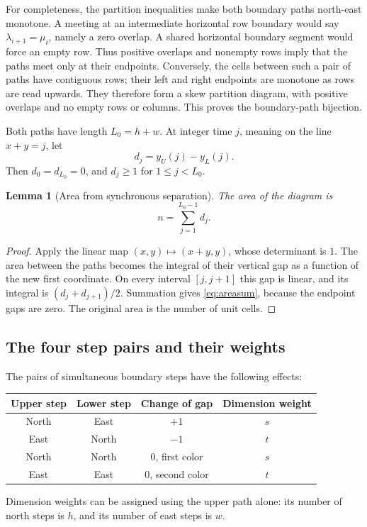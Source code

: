 \documentclass[11pt,letterpaper]{article}
\numberwithin{equation}{section}
\newtheorem{lemma}[theorem]{Lemma}
\theoremstyle{definition}
\begin{document}
For completeness, the partition inequalities make both boundary paths
north-east monotone. A meeting at an intermediate horizontal row boundary
would say $\lambda_{i+1}=\mu_i$, namely a zero overlap. A shared horizontal
boundary segment would force an empty row. Thus positive overlaps and
nonempty rows imply that the paths meet only at their endpoints.
Conversely, the cells between such a pair of paths have contiguous rows;
their left and right endpoints are monotone as rows are read upwards.
They therefore form a skew partition diagram, with positive overlaps and
no empty rows or columns. This proves the boundary-path bijection.

Both paths have length $L_0=h+w$. At integer time $j$, meaning on the line
$x+y=j$, let
\begin{equation}
 d_j=y_U(j)-y_L(j).
 \label{eq:gaps}
\end{equation}
Then $d_0=d_{L_0}=0$, and $d_j\ge1$ for $1\le j<L_0$.

\begin{lemma}[Area from synchronous separation]
\label{lem:area}
The area of the diagram is
\begin{equation}
 n=\sum_{j=1}^{L_0-1}d_j.
 \label{eq:areasum}
\end{equation}
\end{lemma}
\begin{proof}
Apply the linear map $(x,y)\mapsto(x+y,y)$, whose determinant is $1$.
The area between the paths becomes the integral of their vertical gap as
a function of the new first coordinate. On every interval $[j,j+1]$ this
gap is linear, and its integral is $(d_j+d_{j+1})/2$. Summation gives
\eqref{eq:areasum}, because the endpoint gaps are zero. The original area
is the number of unit cells.
\end{proof}

\subsection{The four step pairs and their weights}
The pairs of simultaneous boundary steps have the following effects:
\begin{center}
\begin{tabular}{@{}c c c c@{}}
\toprule
Upper step & Lower step & Change of gap & Dimension weight\\
\midrule
North & East & $+1$ & $s$\\
East & North & $-1$ & $t$\\
North & North & $0$, first color & $s$\\
East & East & $0$, second color & $t$\\
\bottomrule
\end{tabular}
\end{center}
Dimension weights can be assigned using the upper path alone: its number
of north steps is $h$, and its number of east steps is $w$.
\end{document}
